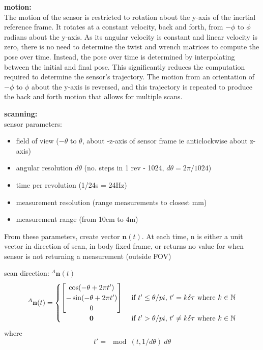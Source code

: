 \textbf{motion:}\\
The motion of the sensor is restricted to rotation about the y-axis of the inertial reference frame. It rotates at a constant velocity, back and forth, from $-\phi$ to $\phi$ radians about the y-axis.  As its angular velocity is constant and linear velocity is zero, there is no need to determine the twist and wrench matrices to compute the pose over time. Instead, the pose over time is determined by interpolating between the initial and final pose. This significantly reduces the computation required to determine the sensor's trajectory. The motion from an orientation of $-\phi$ to $\phi$ about the y-axis is reversed, and this trajectory is repeated to produce the back and forth motion that allows for multiple scans.

\textbf{scanning:}\\
sensor parameters:
\begin{itemize}
\item field of view ($-\theta$ to $\theta$, about -z-axis of sensor frame ie anticlockwise about z-axis)
\item angular resolution $d\theta$ (no. steps in 1 rev - 1024, $d\theta = 2\pi/1024$)
\item time per revolution (1/24s = 24Hz)
\item measurement resolution (range measurements to closest mm)
\item measurement range (from 10cm to 4m)
\end{itemize}
From these parameters, create vector $\mathbf{n}(t)$. At each time, n is either a unit vector in direction of scan, in body fixed frame, or returns no value for when sensor is not returning a measurement (outside FOV)

scan direction: $^{A}\mathbf{n}(t)$
\begin{equation}
^{A}\mathbf{n}(t) =
	\begin{cases} 
	      \hfill \begin{bmatrix}
	      		\cos(-\theta + 2\pi t') \\
	      		-\sin(-\theta + 2\pi t') \\
	      		0
	      	\end{bmatrix}    \hfill & \text{ if $t' \leq \theta/pi$, $t' = k\delta\tau$ where $k \in \mathbb{N}$} \\
	      \hfill \mathbf{0} \hfill & \text{ if $t' > \theta/pi$, $t' \neq k\delta\tau$ where $k \in \mathbb{N}$} \\
	\end{cases} 
\end{equation}
where
\begin{equation}
t' = \mod(t,1/d\theta)\:d\theta
\end{equation}

